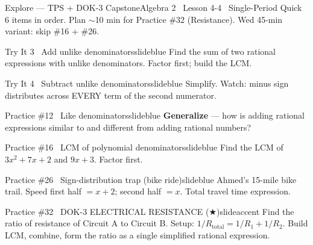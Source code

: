 \documentclass[aspectratio=169, 11pt]{beamer}
\begin{document}
\begin{frame}{Explore --- TPS + DOK-3 Capstone}{Algebra 2 \textperiodcentered\ Lesson 4-4 \textperiodcentered\ Single-Period Quick}
\small\textcolor{slidegray}{6 items in order. Plan \(\sim\)10 min for Practice \#32 (Resistance). Wed 45-min variant: skip \#16 + \#26.}

\vspace{0.1cm}
\begin{projcard}{Try It 3 \textperiodcentered\ Add unlike denominators}{slideblue}
Find the sum of two rational expressions with unlike denominators. Factor first; build the LCM.
\end{projcard}
\vspace{-0.12cm}
\begin{projcard}{Try It 4 \textperiodcentered\ Subtract unlike denominators}{slideblue}
Simplify. Watch: minus sign distributes across EVERY term of the second numerator.
\end{projcard}
\vspace{-0.12cm}
\begin{projcard}{Practice \#12 \textperiodcentered\ Like denominators}{slideblue}
\textbf{Generalize} --- how is adding rational expressions similar to and different from adding rational numbers?
\end{projcard}
\vspace{-0.12cm}
\begin{projcard}{Practice \#16 \textperiodcentered\ LCM of polynomial denominators}{slideblue}
Find the LCM of \(3x^2+7x+2\) and \(9x+3\). Factor first.
\end{projcard}
\vspace{-0.12cm}
\begin{projcard}{Practice \#26 \textperiodcentered\ Sign-distribution trap (bike ride)}{slideblue}
Ahmed's 15-mile bike trail. Speed first half \(= x+2\); second half \(= x\). Total travel time expression.
\end{projcard}
\vspace{-0.12cm}
\begin{projcard}{Practice \#32 \textperiodcentered\ DOK-3 ELECTRICAL RESISTANCE (\(\bigstar\))}{slideaccent}
Find the ratio of resistance of Circuit A to Circuit B. Setup: \(1/R_{\text{total}} = 1/R_1 + 1/R_2\). Build LCM, combine, form the ratio as a single simplified rational expression.
\end{projcard}
\end{frame}
\end{document}
